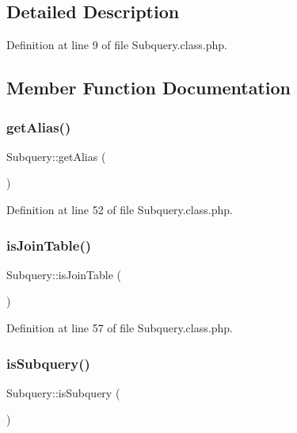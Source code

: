 \subsection{Detailed Description}


Definition at line 9 of file Subquery.\+class.\+php.



\subsection{Member Function Documentation}
\hypertarget{classSubquery_a6e48c79aecdeae3623d9b67b77e15a0e}{}\label{classSubquery_a6e48c79aecdeae3623d9b67b77e15a0e} 
\subsubsection{\texorpdfstring{get\+Alias()}{getAlias()}}
{\footnotesize\ttfamily Subquery\+::get\+Alias (\begin{DoxyParamCaption}{ }\end{DoxyParamCaption})}



Definition at line 52 of file Subquery.\+class.\+php.

\hypertarget{classSubquery_a92a4ae32701020381a7725d625926260}{}\label{classSubquery_a92a4ae32701020381a7725d625926260} 
\subsubsection{\texorpdfstring{is\+Join\+Table()}{isJoinTable()}}
{\footnotesize\ttfamily Subquery\+::is\+Join\+Table (\begin{DoxyParamCaption}{ }\end{DoxyParamCaption})}



Definition at line 57 of file Subquery.\+class.\+php.

\hypertarget{classSubquery_adea0bfe78ba0f6318fa9f181286e1482}{}\label{classSubquery_adea0bfe78ba0f6318fa9f181286e1482} 
\subsubsection{\texorpdfstring{is\+Subquery()}{isSubquery()}}
{\footnotesize\ttfamily Subquery\+::is\+Subquery (\begin{DoxyParamCaption}{ }\end{DoxyParamCaption})}



